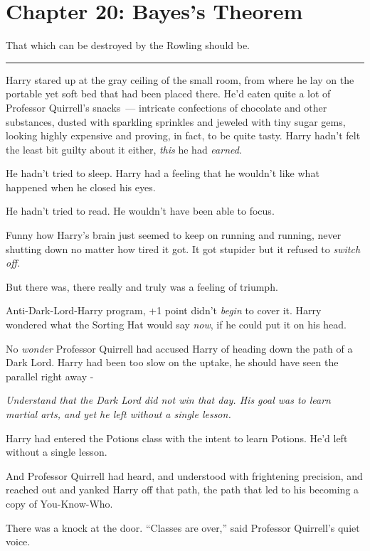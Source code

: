 \chapter{Chapter 20: Bayes's Theorem}
That which can be destroyed by the Rowling should be.

\begin{center}\rule{3in}{0.4pt}\end{center}

Harry stared up at the gray ceiling of the small room, from where he lay on the portable yet soft bed that had been placed there. He'd eaten quite a lot of Professor Quirrell's snacks~--- intricate confections of chocolate and other substances, dusted with sparkling sprinkles and jeweled with tiny sugar gems, looking highly expensive and proving, in fact, to be quite tasty. Harry hadn't felt the least bit guilty about it either, \emph{this} he had \emph{earned}.

He hadn't tried to sleep. Harry had a feeling that he wouldn't like what happened when he closed his eyes.

He hadn't tried to read. He wouldn't have been able to focus.

Funny how Harry's brain just seemed to keep on running and running, never shutting down no matter how tired it got. It got stupider but it refused to \emph{switch off.}

But there was, there really and truly was a feeling of triumph.

Anti-Dark-Lord-Harry program, +1 point didn't \emph{begin} to cover it. Harry wondered what the Sorting Hat would say \emph{now}, if he could put it on his head.

No \emph{wonder} Professor Quirrell had accused Harry of heading down the path of a Dark Lord. Harry had been too slow on the uptake, he should have seen the parallel right away -

\emph{Understand that the Dark Lord did not win that day. His goal was to learn martial arts, and yet he left without a single lesson.}

Harry had entered the Potions class with the intent to learn Potions. He'd left without a single lesson.

And Professor Quirrell had heard, and understood with frightening precision, and reached out and yanked Harry off that path, the path that led to his becoming a copy of You-Know-Who.

There was a knock at the door. ``Classes are over,'' said Professor Quirrell's quiet voice.

